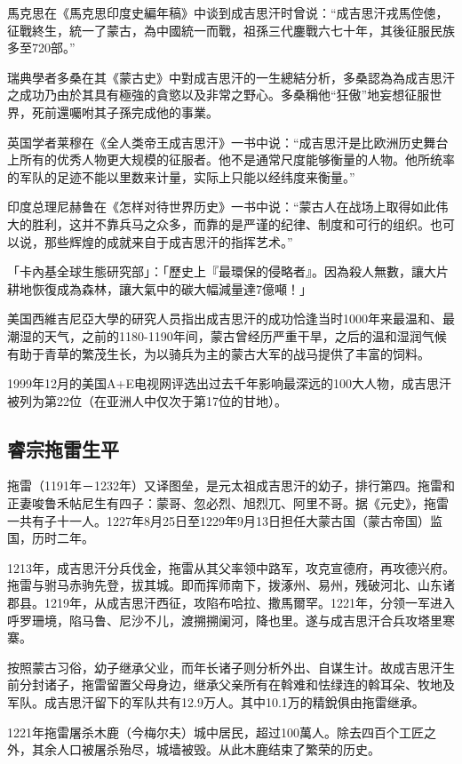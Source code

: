 馬克思在《馬克思印度史編年稿》中谈到成吉思汗时曾说：“成吉思汗戎馬倥傯，征戰終生，統一了蒙古，為中國統一而戰，祖孫三代鏖戰六七十年，其後征服民族多至720部。”

瑞典學者多桑在其《蒙古史》中對成吉思汗的一生總結分析，多桑認為為成吉思汗之成功乃由於其具有極強的貪慾以及非常之野心。多桑稱他“狂傲”地妄想征服世界，死前還囑咐其子孫完成他的事業。

英国学者莱穆在《全人类帝王成吉思汗》一书中说：“成吉思汗是比欧洲历史舞台上所有的优秀人物更大规模的征服者。他不是通常尺度能够衡量的人物。他所统率的军队的足迹不能以里数来计量，实际上只能以经纬度来衡量。”

印度总理尼赫鲁在《怎样对待世界历史》一书中说：“蒙古人在战场上取得如此伟大的胜利，这并不靠兵马之众多，而靠的是严谨的纪律、制度和可行的组织。也可以说，那些辉煌的成就来自于成吉思汗的指挥艺术。”

「卡內基全球生態研究部」：「歷史上『最環保的侵略者』。因為殺人無數，讓大片耕地恢復成為森林，讓大氣中的碳大幅減量達7億噸！」

美国西維吉尼亞大學的研究人员指出成吉思汗的成功恰逢当时1000年来最温和、最潮湿的天气，之前的1180-1190年间，蒙古曾经历严重干旱，之后的温和湿润气候有助于青草的繁茂生长，为以骑兵为主的蒙古大军的战马提供了丰富的饲料。

1999年12月的美国A+E电视网评选出过去千年影响最深远的100大人物，成吉思汗被列为第22位（在亚洲人中仅次于第17位的甘地）。

\subsection{睿宗拖雷生平}

拖雷（1191年－1232年）又译图垒，是元太祖成吉思汗的幼子，排行第四。拖雷和正妻唆鲁禾帖尼生有四子：蒙哥、忽必烈、旭烈兀、阿里不哥。据《元史》，拖雷一共有子十一人。1227年8月25日至1229年9月13日担任大蒙古国（蒙古帝国）监国，历时二年。

1213年，成吉思汗分兵伐金，拖雷从其父率领中路军，攻克宣德府，再攻德兴府。拖雷与驸马赤驹先登，拔其城。即而挥师南下，拨涿州、易州，残破河北、山东诸郡县。1219年，从成吉思汗西征，攻陷布哈拉、撒馬爾罕。1221年，分领一军进入呼罗珊境，陷马鲁、尼沙不儿，渡搠搠阑河，降也里。遂与成吉思汗合兵攻塔里寒寨。

按照蒙古习俗，幼子继承父业，而年长诸子则分析外出、自谋生计。故成吉思汗生前分封诸子，拖雷留置父母身边，继承父亲所有在斡难和怯绿连的斡耳朵、牧地及军队。成吉思汗留下的军队共有12.9万人。其中10.1万的精銳俱由拖雷继承。

1221年拖雷屠杀木鹿（今梅尔夫）城中居民，超过100萬人。除去四百个工匠之外，其余人口被屠杀殆尽，城墙被毁。从此木鹿结束了繁荣的历史。

